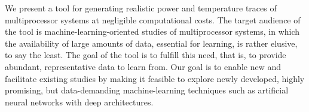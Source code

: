 We present a tool for generating realistic power and temperature traces of
multiprocessor systems at negligible computational costs. The target audience of
the tool is machine-learning-oriented studies of multiprocessor systems, in
which the availability of large amounts of data, essential for learning, is
rather elusive, to say the least. The goal of the tool is to fulfill this need,
that is, to provide abundant, representative data to learn from. Our goal is to
enable new and facilitate existing studies by making it feasible to explore
newly developed, highly promising, but data-demanding machine-learning
techniques such as artificial neural networks with deep architectures.

